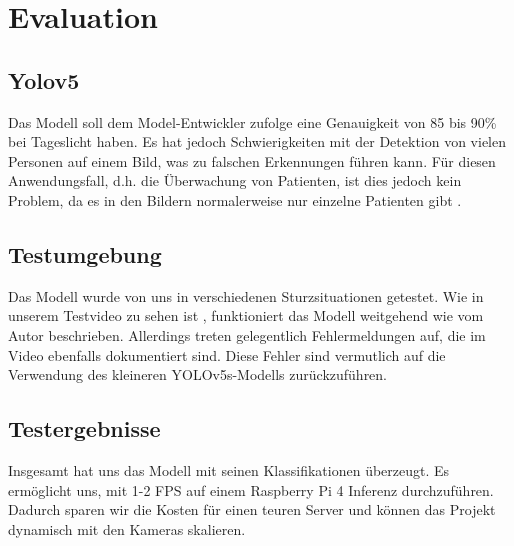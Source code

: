 \section{Evaluation}

\subsection{Yolov5}
Das Modell soll dem Model-Entwickler zufolge eine Genauigkeit von 85 bis 90\% bei Tageslicht haben. Es hat jedoch Schwierigkeiten mit der Detektion von vielen Personen auf einem Bild, was zu falschen Erkennungen führen kann. Für diesen Anwendungsfall, d.h. die Überwachung von Patienten, ist dies jedoch kein Problem, da es in den Bildern normalerweise nur einzelne Patienten gibt \cite{kumar_uttej2001image-based-human-fall-detection_2024}. 

\subsection{Testumgebung}
Das Modell wurde von uns in verschiedenen Sturzsituationen getestet. Wie in unserem Testvideo zu sehen ist \cite{yolovideo}, funktioniert das Modell weitgehend wie vom Autor beschrieben. Allerdings treten gelegentlich Fehlermeldungen auf, die im Video ebenfalls dokumentiert sind. Diese Fehler sind vermutlich auf die Verwendung des kleineren YOLOv5s-Modells zurückzuführen.

\subsection{Testergebnisse}

Insgesamt hat uns das Modell mit seinen Klassifikationen überzeugt. Es ermöglicht uns, mit 1-2 FPS auf einem Raspberry Pi 4 Inferenz durchzuführen. Dadurch sparen wir die Kosten für einen teuren Server und können das Projekt dynamisch mit den Kameras skalieren.